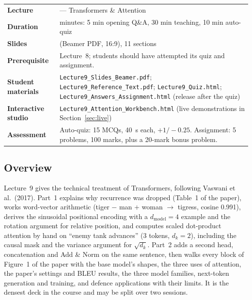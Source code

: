 \documentclass[11pt]{article}
\begin{document}
\begin{center}\small\renewcommand{\arraystretch}{1.25}\begin{tabularx}{\textwidth}{@{}>{\bfseries}p{3.3cm}>{\raggedright\arraybackslash}X@{}}\toprule

\textcolor{NavyN}{Lecture}&9 --- Transformers \& Attention\\
\textcolor{NavyN}{Duration}&45 minutes: 5 min opening Q\&A, 30 min teaching, 10 min auto-quiz\\
\textcolor{NavyN}{Slides}&49 (Beamer PDF, 16:9), 11 sections\\
\textcolor{NavyN}{Prerequisite}&Lecture~8; students should have attempted its quiz and assignment.\\
\textcolor{NavyN}{Student materials}&\texttt{Lecture9\_Slides\_Beamer.pdf}; \texttt{Lecture9\_Reference\_Text.pdf}; \texttt{Lecture9\_Quiz.html}; \texttt{Lecture9\_Answers\_Assignment.html} (release after the quiz)\\
\textcolor{NavyN}{Interactive studio}&\texttt{Lecture9\_Attention\_Workbench.html} (live demonstrations in Section~\ref{sec:live})\\
\textcolor{NavyN}{Assessment}&Auto-quiz: 15 MCQs, 40~s each, $+1/-0.25$. Assignment: 5 problems, 100 marks, plus a 20-mark bonus problem.\\\bottomrule\end{tabularx}\end{center}

\subsection*{Overview}Lecture~9 gives the technical treatment of Transformers, following Vaswani et al.\ (2017). Part~1 explains why recurrence was dropped (Table~1 of the paper), works word-vector arithmetic (tiger $-$ man $+$ woman $\to$ tigress, cosine 0.991), derives the sinusoidal positional encoding with a $d_{\text{model}}=4$ example and the rotation argument for relative position, and computes scaled dot-product attention by hand on ``enemy tank advances'' ($3$ tokens, $d_k=2$), including the causal mask and the variance argument for $\sqrt{d_k}$. Part~2 adds a second head, concatenation and Add \& Norm on the same sentence, then walks every block of Figure~1 of the paper with the base model's shapes, the three uses of attention, the paper's settings and BLEU results, the three model families, next-token generation and training, and defence applications with their limits. It is the densest deck in the course and may be split over two sessions.
\end{document}
